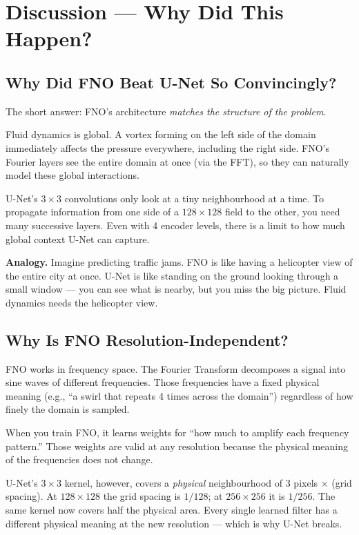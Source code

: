 \documentclass[11pt,twocolumn]{article}
\begin{document}
\section{Discussion --- Why Did This Happen?}

\subsection{Why Did FNO Beat U-Net So Convincingly?}

The short answer: FNO's architecture \emph{matches the structure of the problem}.

Fluid dynamics is global.
A vortex forming on the left side of the domain immediately affects the pressure
everywhere, including the right side.
FNO's Fourier layers see the entire domain at once (via the FFT), so they can
naturally model these global interactions.

U-Net's $3 \times 3$ convolutions only look at a tiny neighbourhood at a time.
To propagate information from one side of a $128 \times 128$ field to the other,
you need many successive layers.
Even with 4 encoder levels, there is a limit to how much global context U-Net
can capture.

\begin{analogybox}
\textbf{Analogy.}
Imagine predicting traffic jams.
FNO is like having a helicopter view of the entire city at once.
U-Net is like standing on the ground looking through a small window ---
you can see what is nearby, but you miss the big picture.
Fluid dynamics needs the helicopter view.
\end{analogybox}

\subsection{Why Is FNO Resolution-Independent?}

FNO works in frequency space.
The Fourier Transform decomposes a signal into sine waves of different
frequencies.
Those frequencies have a fixed physical meaning (e.g., ``a swirl that repeats
4 times across the domain'') regardless of how finely the domain is sampled.

When you train FNO, it learns weights for ``how much to amplify each frequency
pattern.''
Those weights are valid at any resolution because the physical meaning of
the frequencies does not change.

U-Net's $3\times 3$ kernel, however, covers a \emph{physical} neighbourhood of
3 pixels $\times$ (grid spacing).
At $128 \times 128$ the grid spacing is $1/128$; at $256 \times 256$ it is
$1/256$.
The same kernel now covers half the physical area.
Every single learned filter has a different physical meaning at the new
resolution --- which is why U-Net breaks.
\end{document}
